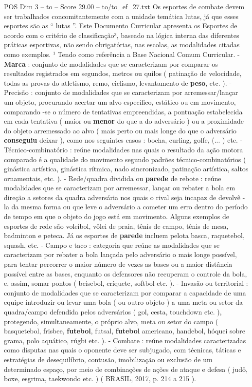 \begin{textsample}{POS Dim 3 – to – Score 29.00 – to/to\_ef\_27.txt}
Os esportes de combate devem ser trabalhados concomitantemente com a unidade temática lutas, já que esses esportes são as “ lutas ”.
Este Documento Curricular apresenta os Esportes de acordo com o critério de classificação³, baseado na lógica interna das diferentes práticas esportivas, não sendo obrigatórias, nas escolas, as modalidades citadas como exemplos. ¹ Tendo como referência a Base Nacional Comum Curricular. - \textbf{Marca} : conjunto de modalidades que se caracterizam por comparar os resultados registrados em segundos, metros ou quilos ( patinação de velocidade, todas as provas do atletismo, remo, ciclismo, levantamento de \textbf{peso}, etc. ). - Precisão : conjunto de modalidades que se caracterizam por arremessar/lançar um objeto, procurando acertar um alvo específico, estático ou em movimento, comparando -se o número de tentativas empreendidas, a pontuação estabelecida em cada tentativa ( maior ou \textbf{menor} do que a do adversário ) ou a proximidade do objeto arremessado ao alvo ( mais perto ou mais longe do que o adversário \textbf{conseguiu} deixar ), como nos seguintes casos : bocha, curling, golfe, (... ) etc. - Técnico-combinatório : reúne modalidades nas quais o resultado da ação motora comparado é a qualidade do movimento segundo padrões técnico-combinatórios ( ginástica artística, ginástica rítmica, nado sincronizado, patinação artística, saltos ornamentais, etc. ). - Rede/quadra dividida ou \textbf{parede} de rebote : reúne modalidades que se caracterizam por arremessar, lançar ou rebater a bola em direção a setores da quadra adversária nos quais o rival seja incapaz de devolvê -la da mesma forma ou que leve o adversário a cometer um erro dentro do período de tempo em que o objeto do jogo está em movimento.
Alguns exemplos de esportes de rede são voleibol, vôlei de praia, tênis de campo, tênis de mesa, badminton e peteca.
Já os esportes de \textbf{parede} incluem pelota basca, raquetebol, squash, etc. - Campo e taco : categoria que reúne as modalidades que se caracterizam por rebater a bola lançada pelo adversário o mais longe possível, para tentar percorrer o maior número de vezes as bases ou a maior distância possível entre as bases, enquanto os defensores não recuperam o controle da bola, e, assim, somar pontos ( beisebol, críquete, softbol etc. ). - Invasão ou territorial : conjunto de modalidades que se caracterizam por comparar a capacidade de uma equipe introduzir ou levar uma bola ( ou outro objeto ) a uma meta ou setor da quadra/campo defendida pelos adversários ( gol, cesta, touchdown etc. ), protegendo, simultaneamente, o próprio alvo, meta ou setor do campo ( basquetebol, frisbee, \textbf{futebol}, futsal, \textbf{futebol} americano, handebol, hóquei sobre grama, polo aquático, rúgbi etc. ). - Combate : reúne modalidades caracterizadas como disputas nas quais o oponente deve ser subjugado, com técnicas, táticas e estratégias de desequilíbrio, contusão, imobilização ou exclusão de um determinado espaço, por meio de combinações de ações de ataque e defesa ( judô, boxe, esgrima, taekwondo etc. ) ( BRASIL, 2017, p. 214 a 215 ).

\end{textsample}
